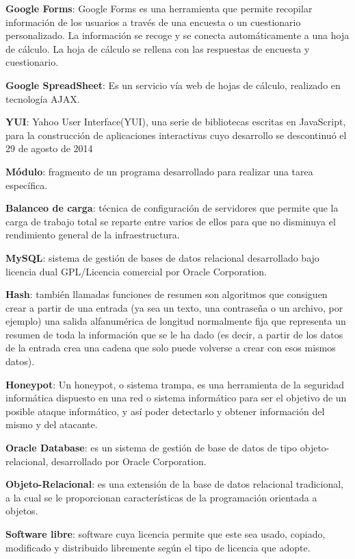 \textbf{Google Forms}: Google Forms es una herramienta que permite recopilar información de los usuarios a través de una encuesta o un cuestionario personalizado. La información se recoge y se conecta automáticamente a una hoja de cálculo. La hoja de cálculo se rellena con las respuestas de encuesta y cuestionario.
\bigskip

\textbf{Google SpreadSheet}: Es un servicio vía web de hojas de cálculo, realizado en tecnología AJAX.
\bigskip



\textbf{YUI}: Yahoo User Interface(YUI), una serie de bibliotecas escritas en JavaScript, para la construcción de aplicaciones interactivas cuyo desarrollo se descontinuó el 29 de agosto de 2014



\textbf{Módulo}: fragmento de un programa desarrollado para realizar una tarea específica.
\bigskip

\textbf{Balanceo de carga}: técnica de configuración de servidores que permite que la carga de trabajo total se reparte entre varios de ellos para que no disminuya el rendimiento general de la infraestructura.
\bigskip


\textbf{MySQL}: sistema de gestión de bases de datos relacional desarrollado bajo licencia dual GPL/Licencia comercial por Oracle Corporation.
\bigskip

\textbf{Hash}: también llamadas funciones de resumen son algoritmos que consiguen crear a partir de una entrada (ya sea un texto, una contraseña o un archivo, por ejemplo) una salida alfanumérica de longitud normalmente fija que representa un resumen de toda la información que se le ha dado (es decir, a partir de los datos de la entrada crea una cadena que solo puede volverse a crear con esos mismos datos).
\bigskip

\textbf{Honeypot}: Un honeypot, o sistema trampa, es una herramienta de la seguridad informática dispuesto en una red o sistema informático para ser el objetivo de un posible ataque informático, y así poder detectarlo y obtener información del mismo y del atacante.
\bigskip

\textbf{Oracle Database}: es un sistema de gestión de base de datos de tipo objeto-relacional, desarrollado por Oracle Corporation.
\bigskip

 \textbf{Objeto-Relacional}: es una extensión de la base de datos relacional tradicional, a la cual se le proporcionan características de la programación orientada a objetos.
\bigskip

\textbf{Software libre}: software cuya licencia permite que este sea usado, copiado, modificado y distribuido libremente según el tipo de licencia que adopte.
\bigskip
